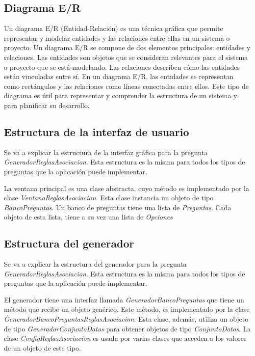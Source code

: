 \subsection{Diagrama E/R}

Un diagrama E/R (Entidad-Relación) es una técnica gráfica que permite representar y modelar entidades y las relaciones entre ellas en un sistema o proyecto. Un diagrama E/R se compone de dos elementos principales: entidades y relaciones. Las entidades son objetos que se consideran relevantes para el sistema o proyecto que se está modelando. Las relaciones describen cómo las entidades están vinculadas entre sí. En un diagrama E/R, las entidades se representan como rectángulos y las relaciones como líneas conectadas entre ellos. Este tipo de diagrama es útil para representar y comprender la estructura de un sistema y para planificar su desarrollo.


\subsection{Estructura de la interfaz de usuario}

Se va a explicar la estructura de la interfaz gráfica para la pregunta \textit{GeneradorReglasAsociacion}. Esta estructura es la misma para todos los tipos de preguntas que la aplicación puede implementar.

La ventana principal es una clase abstracta, cuyo método es implementado por la clase \textit{VentanaReglasAsociacion}. Esta clase instancia un objeto de tipo \textit{BancoPreguntas}. Un banco de preguntas tiene una lista de \textit{Preguntas}. Cada objeto de esta lista, tiene a su vez una lista de \textit{Opciones}


\subsection{Estructura del generador}

Se va a explicar la estructura del generador para la pregunta \textit{GeneradorReglasAsociacion}. Esta estructura es la misma para todos los tipos de preguntas que la aplicación puede implementar.

El generador tiene una interfaz llamada \textit{GeneradorBancoPreguntas} que tiene un método que recibe un objeto genérico. Este método, es implementado por la clase \textit{GeneradorBancoPreguntasReglasAsociacion}. Esta clase, además, utiliza un objeto de tipo \textit{GeneradorConjuntoDatos} para obtener objetos de tipo \textit{ConjuntoDatos}. La clase \textit{ConfigReglasAsociacion} es usada por varias clases que acceden a los valores de un objeto de este tipo.

